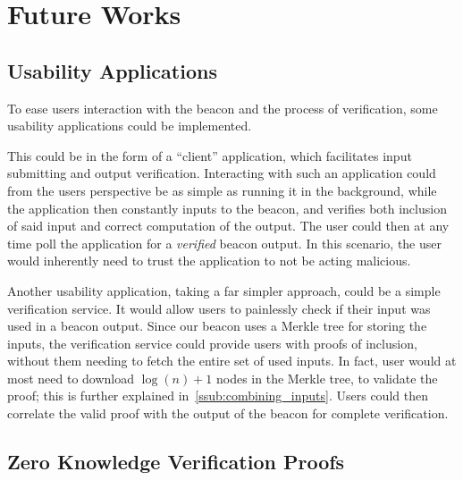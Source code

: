 \section{Future Works}%
\label{sec:future_works}

\subsection{Usability Applications}%
\label{sub:usability_applications}
To ease users interaction with the beacon and the process of verification, some usability applications could be implemented.

This could be in the form of a \enquote{client} application, which facilitates input submitting and output verification.
Interacting with such an application could from the users perspective be as simple as running it in the background, while the application then constantly inputs to the beacon, and verifies both inclusion of said input and correct computation of the output.
The user could then at any time poll the application for a \emph{verified} beacon output.
In this scenario, the user would inherently need to trust the application to not be acting malicious.

Another usability application, taking a far simpler approach, could be a simple verification service.
It would allow users to painlessly check if their input was used in a beacon output.
Since our beacon uses a Merkle tree for storing the inputs, the verification service could provide users with proofs of inclusion, without them needing to fetch the entire set of used inputs.
In fact, user would at most need to download $\log(n) + 1$ nodes in the Merkle tree, to validate the proof; this is further explained in~\vref{ssub:combining_inputs}.
Users could then correlate the valid proof with the output of the beacon for complete verification.

\subsection{Zero Knowledge Verification Proofs}%
\label{sub:zero_knowledge_verification_proofs}
